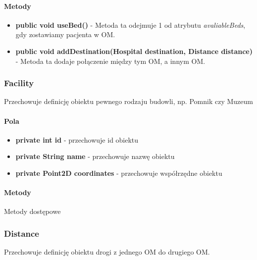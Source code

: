 \documentclass[]{article}
\begin{document}
                \paragraph{Metody}
                    \begin{itemize}
                        \item \textbf{public void useBed()} - 
                            Metoda ta odejmuje 1 od atrybutu \textit{avaliableBeds}, gdy zostawiamy pacjenta w OM.
                        \item \textbf{public void addDestination(Hospital destination, Distance distance)} - 
                            Metoda ta dodaje połączenie między tym OM, a innym OM.
                    \end{itemize}
                    
            \subsubsection{Facility}
                    Przechowuje definicję obiektu pewnego rodzaju budowli, np. Pomnik czy Muzeum
                \paragraph{Pola}
                    \begin{itemize}
                        \item \textbf{private int id} - przechowuje id obiektu
                        \item \textbf{private String name} - przechowuje nazwę obiektu
                        \item \textbf{private Point2D coordinates} - przechowuje współrzędne obiektu
                    \end{itemize}
            
                \paragraph{Metody}
                    Metody dostępowe
                    
            \subsubsection{Distance}
                    Przechowuje definicję obiektu drogi z jednego OM do drugiego OM.
\end{document}
